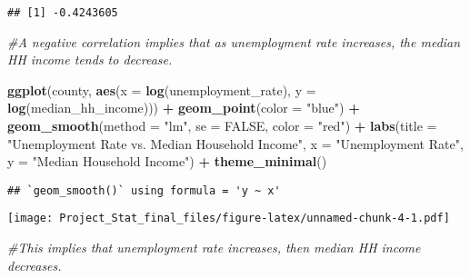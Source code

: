 \documentclass[
]{article}
\newenvironment{Shaded}{\begin{snugshade}}{\end{snugshade}}
\newcommand{\AttributeTok}[1]{\textcolor[rgb]{0.13,0.29,0.53}{#1}}
\newcommand{\CommentTok}[1]{\textcolor[rgb]{0.56,0.35,0.01}{\textit{#1}}}
\newcommand{\ConstantTok}[1]{\textcolor[rgb]{0.56,0.35,0.01}{#1}}
\newcommand{\FunctionTok}[1]{\textcolor[rgb]{0.13,0.29,0.53}{\textbf{#1}}}
\newcommand{\NormalTok}[1]{#1}
\newcommand{\OtherTok}[1]{\textcolor[rgb]{0.56,0.35,0.01}{#1}}
\newcommand{\SpecialCharTok}[1]{\textcolor[rgb]{0.81,0.36,0.00}{\textbf{#1}}}
\newcommand{\StringTok}[1]{\textcolor[rgb]{0.31,0.60,0.02}{#1}}
\begin{document}
\begin{Shaded}
\end{Shaded}

\begin{verbatim}
## [1] -0.4243605
\end{verbatim}

\begin{Shaded}
\begin{Highlighting}[]
\CommentTok{\#A negative correlation implies that as unemployment rate increases, the median HH income tends to decrease.}

\FunctionTok{ggplot}\NormalTok{(county, }\FunctionTok{aes}\NormalTok{(}\AttributeTok{x =} \FunctionTok{log}\NormalTok{(unemployment\_rate), }\AttributeTok{y =} \FunctionTok{log}\NormalTok{(median\_hh\_income))) }\SpecialCharTok{+}
  \FunctionTok{geom\_point}\NormalTok{(}\AttributeTok{color =} \StringTok{"blue"}\NormalTok{) }\SpecialCharTok{+}
  \FunctionTok{geom\_smooth}\NormalTok{(}\AttributeTok{method =} \StringTok{"lm"}\NormalTok{, }\AttributeTok{se =} \ConstantTok{FALSE}\NormalTok{, }\AttributeTok{color =} \StringTok{"red"}\NormalTok{) }\SpecialCharTok{+}
  \FunctionTok{labs}\NormalTok{(}\AttributeTok{title =} \StringTok{"Unemployment Rate vs. Median Household Income"}\NormalTok{,}
       \AttributeTok{x =} \StringTok{"Unemployment Rate"}\NormalTok{, }\AttributeTok{y =} \StringTok{"Median Household Income"}\NormalTok{) }\SpecialCharTok{+}
  \FunctionTok{theme\_minimal}\NormalTok{()}
\end{Highlighting}
\end{Shaded}

\begin{verbatim}
## `geom_smooth()` using formula = 'y ~ x'
\end{verbatim}

\texttt{[image: Project\_Stat\_final\_files/figure-latex/unnamed-chunk-4-1.pdf]}

\begin{Shaded}
\begin{Highlighting}[]
\CommentTok{\#This implies that unemployment rate increases, then median HH income decreases.}
\end{Highlighting}
\end{Shaded}
\end{document}
